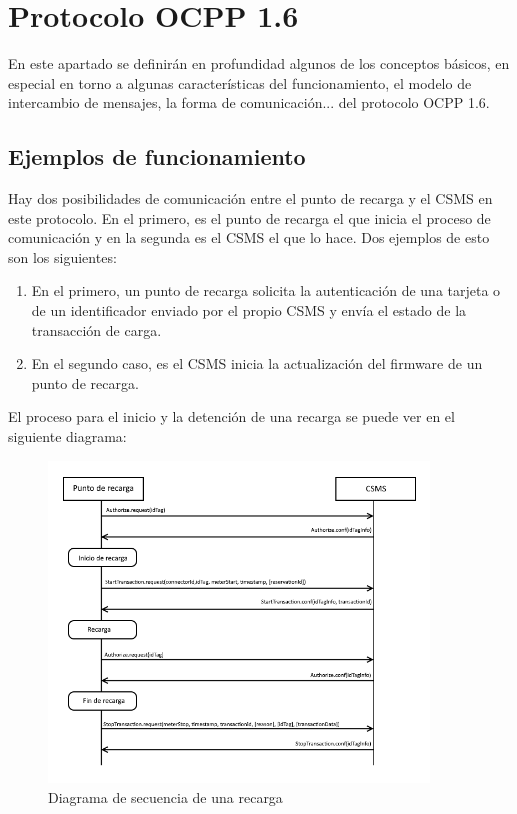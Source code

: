 \documentclass[12pt,a4paper,onecolumn,oneside]{report}
\begin{document}
\section{Protocolo OCPP 1.6}
\label{Protocolo OCPP 1.6}

En este apartado se definirán en profundidad algunos de los conceptos básicos, en especial en torno a algunas características del funcionamiento, el modelo de intercambio de mensajes, la forma de comunicación... del protocolo OCPP 1.6.


\subsection{Ejemplos de funcionamiento}
\label{Ejemplos de funcionamiento}

Hay dos posibilidades de comunicación entre el punto de recarga y el CSMS en este protocolo. En el primero, es el punto de recarga el que inicia el proceso de comunicación y en la segunda es el CSMS el que lo hace. Dos ejemplos de esto son los siguientes:

\begin{enumerate}

\item En el primero, un punto de recarga solicita la autenticación de una tarjeta o de un identificador enviado por el propio CSMS y envía el estado de la transacción de carga.

\item En el segundo caso, es el CSMS inicia la actualización del firmware de un punto de recarga.

\end{enumerate}

El proceso para el inicio y la detención de una recarga se puede ver en el siguiente diagrama:

\begin{figure}[H] 
\centering
  \includegraphics[width=0.9\textwidth]{figuras/diagramainiciofincarga.png}
  \caption[Diagrama de secuencia de una recarga]{Diagrama de secuencia de una recarga\\
  }
  \label{fig:diagramarecarga}
\end{figure}
\end{document}
